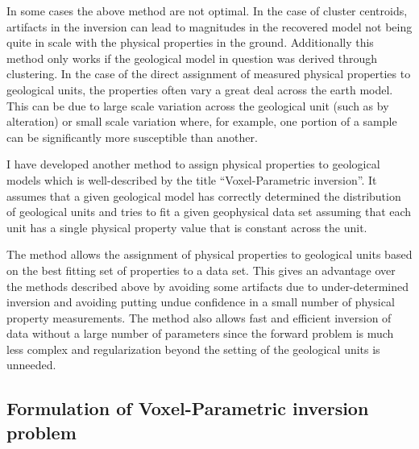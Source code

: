 In some cases the above method are not optimal. In the case of cluster centroids, artifacts in the inversion can lead to magnitudes in the recovered model not being quite in scale with the physical properties in the ground. Additionally this method only works if the geological model in question was derived through clustering. In the case of the direct assignment of measured physical properties to geological units, the properties often vary a great deal across the earth model. This can be due to large scale variation across the geological unit (such as by alteration) or small scale variation where, for example, one portion of a sample can be significantly more susceptible than another.

I have developed another method to assign physical properties to geological models which is well-described by the title ``Voxel-Parametric inversion''. It assumes that a given geological model has correctly determined the distribution of geological units and tries to fit a given geophysical data set assuming that each unit has a single physical property value that is constant across the unit. 

The method allows the assignment of physical properties to geological units based on the best fitting set of properties to a data set. This gives an advantage over the methods described above by avoiding some artifacts due to under-determined inversion and avoiding putting undue confidence in a small number of physical property measurements. The method also allows fast and efficient inversion of data without a large number of parameters since the forward problem is much less complex and regularization beyond the setting of the geological units is unneeded.

\subsection{Formulation of Voxel-Parametric inversion problem}
\label{subsec:voxelParamFormulation}

